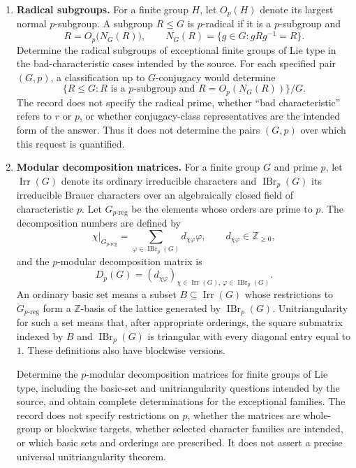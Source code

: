 \documentclass[11pt]{article}
\newcommand{\Z}{\mathbb{Z}}
\begin{document}
\begin{enumerate}
\item \textbf{Radical subgroups.} For a finite group \(H\), let \(O_p(H)\) denote its largest normal \(p\)-subgroup. A subgroup \(R\leq G\) is \(p\)-radical if it is a \(p\)-subgroup and
\[
R=O_p\bigl(N_G(R)\bigr),
\qquad
N_G(R)=\{g\in G:gRg^{-1}=R\}.
\]
Determine the radical subgroups of exceptional finite groups of Lie type in the bad-characteristic cases intended by the source. For each specified pair \((G,p)\), a classification up to \(G\)-conjugacy would determine
\[
\{R\leq G:R\text{ is a }p\text{-subgroup and }R=O_p(N_G(R))\}/G.
\]
The record does not specify the radical prime, whether ``bad characteristic'' refers to \(r\) or \(p\), or whether conjugacy-class representatives are the intended form of the answer. Thus it does not determine the pairs \((G,p)\) over which this request is quantified.

\item \textbf{Modular decomposition matrices.} For a finite group \(G\) and prime \(p\), let \(\operatorname{Irr}(G)\) denote its ordinary irreducible characters and \(\operatorname{IBr}_p(G)\) its irreducible Brauer characters over an algebraically closed field of characteristic \(p\). Let \(G_{p\text{-reg}}\) be the elements whose orders are prime to \(p\). The decomposition numbers are defined by
\[
\chi\big|_{G_{p\text{-reg}}}
 =\sum_{\varphi\in\operatorname{IBr}_p(G)}d_{\chi\varphi}\varphi,
\qquad d_{\chi\varphi}\in\Z_{\geq0},
\]
and the \(p\)-modular decomposition matrix is
\[
D_p(G)=(d_{\chi\varphi})_{\chi\in\operatorname{Irr}(G),\,
\varphi\in\operatorname{IBr}_p(G)}.
\]
An ordinary basic set means a subset \(B\subseteq\operatorname{Irr}(G)\) whose restrictions to \(G_{p\text{-reg}}\) form a \(\Z\)-basis of the lattice generated by \(\operatorname{IBr}_p(G)\). Unitriangularity for such a set means that, after appropriate orderings, the square submatrix indexed by \(B\) and \(\operatorname{IBr}_p(G)\) is triangular with every diagonal entry equal to \(1\). These definitions also have blockwise versions.

Determine the \(p\)-modular decomposition matrices for finite groups of Lie type, including the basic-set and unitriangularity questions intended by the source, and obtain complete determinations for the exceptional families. The record does not specify restrictions on \(p\), whether the matrices are whole-group or blockwise targets, whether selected character families are intended, or which basic sets and orderings are prescribed. It does not assert a precise universal unitriangularity theorem.


\end{enumerate}
\end{document}
